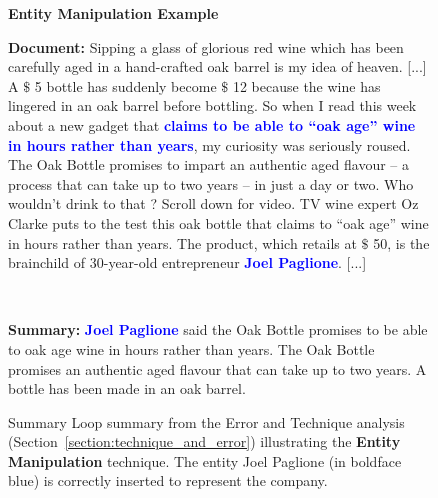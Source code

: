 \documentclass[11pt,a4paper]{article}
\begin{document}
\begin{figure*}[!htbp]
    \begin{framed}
        \begin{center}
            \large
            \textbf{Entity Manipulation Example}
        \end{center}

        \textbf{Document:} Sipping a glass of glorious red wine which has been carefully aged in a hand-crafted oak barrel is my idea of heaven. [...] A $\$$ 5 bottle has suddenly become $\$$ 12 because the wine has lingered in an oak barrel before bottling. So when I read this week about a new gadget that \textbf{\textcolor{blue}{claims to be able to ``oak age'' wine in hours rather than years}}, my curiosity was seriously roused. The Oak Bottle promises to impart an authentic aged flavour -- a process that can take up to two years -- in just a day or two. Who wouldn't drink to that ? Scroll down for video. TV wine expert Oz Clarke puts to the test this oak bottle that claims to ``oak age'' wine in hours rather than years. The product, which retails at $\$$ 50, is the brainchild of 30-year-old entrepreneur \textbf{\textcolor{blue}{Joel Paglione}}. [...]
         \begin{center}
            ~
        \end{center}
        \textbf{Summary:} \textbf{\textcolor{blue}{Joel Paglione}} said the Oak Bottle promises to be able to oak age wine in hours rather than years. The Oak Bottle promises an authentic aged flavour that can take up to two years. A bottle has been made in an oak barrel.
        
    \end{framed}

    \caption{Summary Loop summary from the Error and Technique analysis (Section~\ref{section:technique_and_error}) illustrating the \textbf{Entity Manipulation} technique. The entity Joel Paglione (in boldface blue) is correctly inserted to represent the company.}
    \label{fig:extra_examples4}
\end{figure*}
\end{document}
